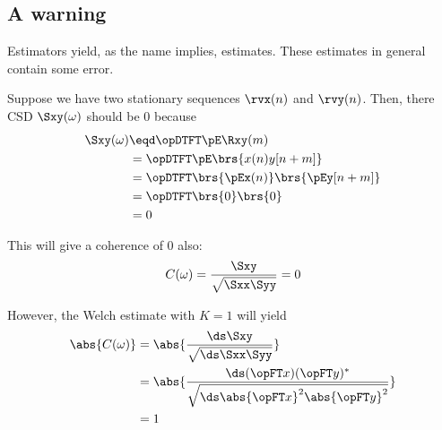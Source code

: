 \subsection{A warning}
Estimators yield, as the name implies, estimates.
These estimates in general contain some error.

\begin{example}[The K=1 Welch estimate of coherence]
Suppose we have two  stationary sequences $\rvx(n)$ and $\rvy(n)$. Then, there
CSD $\Sxy(\omega)$ should be $0$ because
\begin{align*}
  \Sxy(\omega)
    &\eqd \opDTFT\pE\Rxy(m)
  \\&=    \opDTFT\pE\brs{x(n)y[n+m]}
  \\&=    \opDTFT\brs{\pEx(n)} \brs{\pEy[n+m]}
  \\&=    \opDTFT\brs{0} \brs{0}
  \\&=    0
\end{align*}

This will give a coherence of $0$ also:
\[ C(\omega) = \frac{\Sxy}{\sqrt{\Sxx\Syy}} = 0\]

However, the Welch estimate with $K=1$ will yield
\begin{align*}
  \abs{C(\omega)}
    &= \abs{\frac{\ds\Sxy}{\sqrt{\ds\Sxx\Syy}}}
  \\&= \abs{\frac{\ds (\opFT x)(\opFT y)^\ast}{\sqrt{\ds\abs{\opFT x}^2\abs{\opFT y}^2}}}
  \\&= 1
\end{align*}

\end{example}
